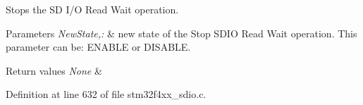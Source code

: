 Stops the S\-D I/\-O Read Wait operation. 


\begin{DoxyParams}{Parameters}
{\em New\-State,\-:} & new state of the Stop S\-D\-I\-O Read Wait operation. This parameter can be\-: E\-N\-A\-B\-L\-E or D\-I\-S\-A\-B\-L\-E. \\
\hline
\end{DoxyParams}

\begin{DoxyRetVals}{Return values}
{\em None} & \\
\hline
\end{DoxyRetVals}


Definition at line 632 of file stm32f4xx\-\_\-sdio.\-c.

